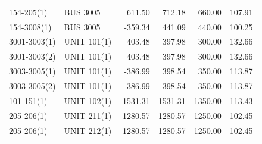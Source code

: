 \documentclass[10pt]{report}
\begin{document}
\begin{table}[H]
{\begin{tabular}{llrrrr}
154-205(1) & BUS 3005 & 611.50 & 712.18 & 660.00 & 107.91 \\
154-3008(1) & BUS 3005 & -359.34 & 441.09 & 440.00 & 100.25 \\
3001-3003(1) & UNIT 101(1) & 403.48 & 397.98 & 300.00 & 132.66 \\
3001-3003(2) & UNIT 101(1) & 403.48 & 397.98 & 300.00 & 132.66 \\
3003-3005(1) & UNIT 101(1) & -386.99 & 398.54 & 350.00 & 113.87 \\
3003-3005(2) & UNIT 101(1) & -386.99 & 398.54 & 350.00 & 113.87 \\
101-151(1) & UNIT 102(1) & 1531.31 & 1531.31 & 1350.00 & 113.43 \\
205-206(1) & UNIT 211(1) & -1280.57 & 1280.57 & 1250.00 & 102.45 \\
205-206(1) & UNIT 212(1) & -1280.57 & 1280.57 & 1250.00 & 102.45 \\
\bottomrule
\end{tabular}}
\end{table}
\end{document}
